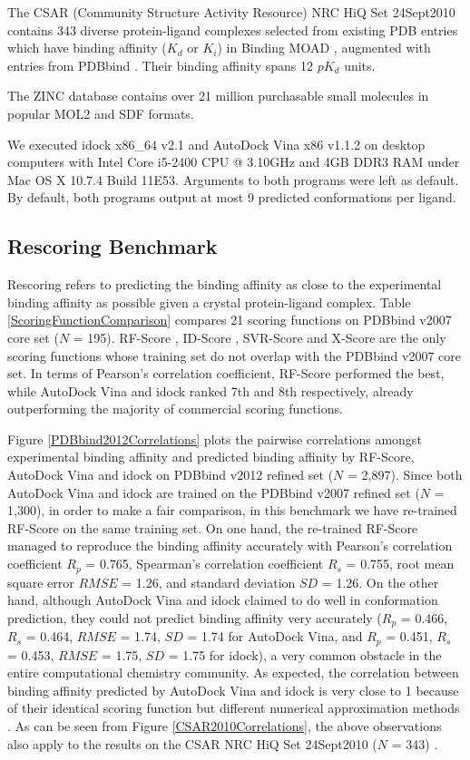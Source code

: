 \documentclass[10pt]{article}
\begin{document}
The CSAR (Community Structure Activity Resource) NRC HiQ Set 24Sept2010 contains 343 diverse protein-ligand complexes selected from existing PDB \cite{540,537} entries which have binding affinity ($K_d$ or $K_i$) in Binding MOAD \cite{517,518}, augmented with entries from PDBbind \cite{529,530}. Their binding affinity spans 12 $pK_d$ units.

The ZINC database contains over 21 million purchasable small molecules in popular MOL2 and SDF formats.

We executed idock x86\_64 v2.1 and AutoDock Vina x86 v1.1.2 on desktop computers with Intel Core i5-2400 CPU @ 3.10GHz and 4GB DDR3 RAM under Mac OS X 10.7.4 Build 11E53. Arguments to both programs were left as default. By default, both programs output at most 9 predicted conformations per ligand.

\subsection*{Rescoring Benchmark}
Rescoring refers to predicting the binding affinity as close to the experimental binding affinity as possible given a crystal protein-ligand complex. Table \ref{ScoringFunctionComparison} compares 21 scoring functions on PDBbind v2007 core set ($N$ = 195). RF-Score \cite{564}, ID-Score \cite{1305}, SVR-Score \cite{1295} and X-Score \cite{573} are the only scoring functions whose training set do not overlap with the PDBbind v2007 core set. In terms of Pearson's correlation coefficient, RF-Score performed the best, while AutoDock Vina and idock ranked 7th and 8th respectively, already outperforming the majority of commercial scoring functions.

Figure \ref{PDBbind2012Correlations} plots the pairwise correlations amongst experimental binding affinity and predicted binding affinity by RF-Score, AutoDock Vina and idock on PDBbind v2012 \cite{529,530} refined set ($N$ = 2,897). Since both AutoDock Vina and idock are trained on the PDBbind v2007 refined set ($N$ = 1,300), in order to make a fair comparison, in this benchmark we have re-trained RF-Score on the same training set. On one hand, the re-trained RF-Score managed to reproduce the binding affinity accurately with Pearson's correlation coefficient $R_p$ = 0.765, Spearman's correlation coefficient $R_s$ = 0.755, root mean square error $RMSE$ = 1.26, and standard deviation $SD$ = 1.26. On the other hand, although AutoDock Vina and idock claimed to do well in conformation prediction, they could not predict binding affinity very accurately ($R_p$ = 0.466, $R_s$ = 0.464, $RMSE$ = 1.74, $SD$ = 1.74 for AutoDock Vina, and $R_p$ = 0.451, $R_s$ = 0.453, $RMSE$ = 1.75, $SD$ = 1.75 for idock), a very common obstacle in the entire computational chemistry community. As expected, the correlation between binding affinity predicted by AutoDock Vina and idock is very close to 1 because of their identical scoring function but different numerical approximation methods \cite{1153}. As can be seen from Figure \ref{CSAR2010Correlations}, the above observations also apply to the results on the CSAR NRC HiQ Set 24Sept2010 ($N$ = 343) \cite{857,960}.
\end{document}
